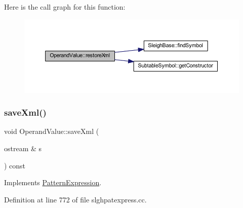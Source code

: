 Here is the call graph for this function\+:
\nopagebreak
\begin{figure}[H]
\begin{center}
\leavevmode
\includegraphics[width=350pt]{class_operand_value_a65387cdd12b8e6135bd9899c76dd2f39_cgraph}
\end{center}
\end{figure}
\mbox{\label{class_operand_value_a106fcb5ccb3fd95a0d97efffd622bc5d}} 
\subsubsection{\texorpdfstring{saveXml()}{saveXml()}}
{\footnotesize\ttfamily void Operand\+Value\+::save\+Xml (\begin{DoxyParamCaption}\item[{ostream \&}]{s }\end{DoxyParamCaption}) const\hspace{0.3cm}{\ttfamily [virtual]}}



Implements \mbox{\hyperlink{class_pattern_expression_a0d9c89ffbf4a22fac68189a845cde92a}{Pattern\+Expression}}.



Definition at line 772 of file slghpatexpress.\+cc.

